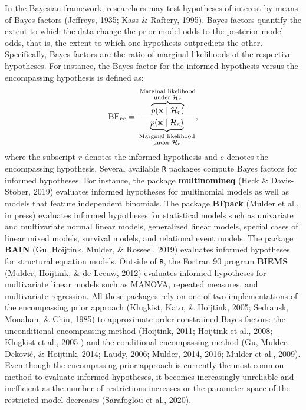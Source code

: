 \documentclass[
  english,
  man,floatsintext]{apa6}
\begin{document}
In the Bayesian framework, researchers may test hypotheses of interest by means of Bayes factors (Jeffreys, 1935; Kass \& Raftery, 1995). Bayes factors quantify the extent to which the data change the prior model odds to the posterior model odds, that is, the extent to which one hypothesis outpredicts the other. Specifically, Bayes factors are the ratio of marginal likelihoods of the respective hypotheses. For instance, the Bayes factor for the informed hypothesis versus the encompassing hypothesis is defined as:
\begin{align*}
\text{BF}_{re} = \cfrac{\overbrace{p(\mathbf{x}\mid \mathcal{H}_r)}^{\substack{\text{Marginal likelihood}\\\text{under $\mathcal{H}_r$}}}}{\underbrace{p(\mathbf{x}\mid \mathcal{H}_e)}_{\substack{\text{Marginal likelihood}\\\text{under $\mathcal{H}_e$}}}},
\end{align*}
where the subscript \(r\) denotes the informed hypothesis and \(e\) denotes the encompassing hypothesis. Several available \texttt{R} packages compute Bayes factors for informed hypotheses. For instance, the package \textbf{multinomineq} (Heck \& Davis-Stober, 2019) evaluates informed hypotheses for multinomial models as well as models that feature independent binomials. The package \textbf{BFpack} (Mulder et al., in press) evaluates informed hypotheses for statistical models such as univariate and multivariate normal linear models, generalized linear models, special cases of linear mixed models, survival models, and relational event models. The package \textbf{BAIN} (Gu, Hoijtink, Mulder, \& Rosseel, 2019) evaluates informed hypotheses for structural equation models. Outside of \texttt{R}, the Fortran 90 program \textbf{BIEMS} (Mulder, Hoijtink, \& de Leeuw, 2012) evaluates informed hypotheses for multivariate linear models such as MANOVA, repeated measures, and multivariate regression. All these packages rely on one of two implementations of the encompassing prior approach (Klugkist, Kato, \& Hoijtink, 2005; Sedransk, Monahan, \& Chiu, 1985) to approximate order constrained Bayes factors: the unconditional encompassing method (Hoijtink, 2011; Hoijtink et al., 2008; Klugkist et al., 2005 ) and the conditional encompassing method (Gu, Mulder, Deković, \& Hoijtink, 2014; Laudy, 2006; Mulder, 2014, 2016; Mulder et al., 2009). Even though the encompassing prior approach is currently the most common method to evaluate informed hypotheses, it becomes increasingly unreliable and inefficient as the number of restrictions increases or the parameter space of the restricted model decreases (Sarafoglou et al., 2020).
\end{document}
